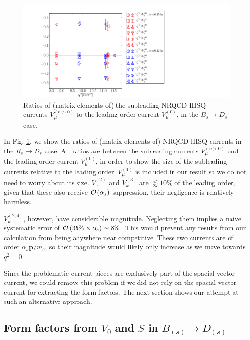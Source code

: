 \begin{figure}[htb!]
  \begin{center}
    \includegraphics[width=1.2\textwidth]{images/nrqcd/BsDs_currentratios.pdf}
  \end{center}
  \caption{Ratios of (matrix elements of) the subleading NRQCD-HISQ currents $V_{\mu}^{(n>0)}$ to the leading order current $V_{\mu}^{(0)}$, in the $B_s\to D_s$ case. \label{eq:currentratios}}
\end{figure}

In Fig. \ref{eq:currentratios}, we show the ratios of (matrix elements of) NRQCD-HISQ currents in the $B_s\to D_s$ case. All ratios are between the subleading currents $V_{\mu}^{(n>0)}$ and the leading order current $V_{\mu}^{(0)}$, in order to show the size of the subleading currents relative to the leading order. $V^{(1)}_{\mu}$ is included in our result so we do not need to worry about its size. $V_0^{(2)}$ and $V_k^{(3)}$ are $\lessapprox 10\%$ of the leading order, given that these also receive $\mathcal{O}\left( \alpha_s \right)$ suppression, their negligence is relatively harmless.

$V_k^{(2,4)}$, however, have considerable magnitude. Neglecting them implies a naive systematic error of $\mathcal{O}\left(  35\% \times \alpha_s  \right) \sim 8\%$. This would prevent any results from our calculation from being anywhere near competitive. These two currents are of order $\alpha_s{\textbf{p}}/m_b$, so their magnitude would likely only increase as we move towards $q^2=0$.

Since the problematic current pieces are exclusively part of the spacial vector current, we could remove this problem if we did not rely on the spacial vector current for extracting the form factors. The next section shows our attempt at such an alternative approach.

\subsection{Form factors from $V_0$ and $S$ in $B_{(s)}\to D_{(s)}$}
\label{sec:fplus_divergence}

